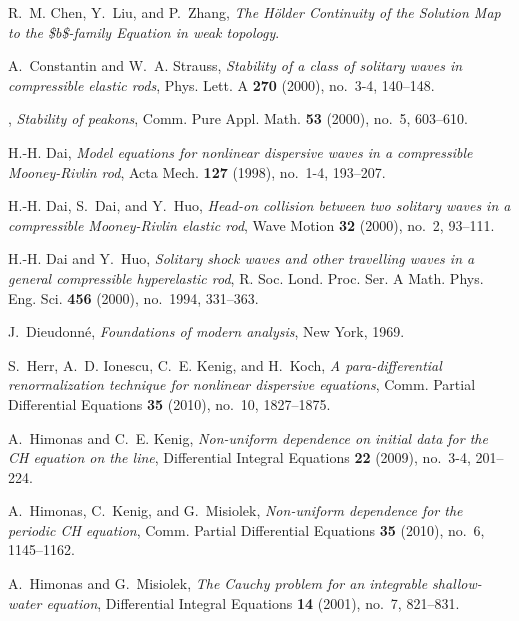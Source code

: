 \documentclass[12pt,reqno]{amsbook}
\numberwithin{section}{chapter}
\numberwithin{equation}{section}  %
\theoremstyle{remark}
\begin{document}
\begin{thebibliography}{HIKK10}
R.~M. Chen, Y.~Liu, and P.~Zhang, \emph{{The H{\"o}lder Continuity of the
  Solution Map to the {\$}b{\$}-family Equation in weak topology}}.

A.~Constantin and W.~A. Strauss, \emph{{Stability of a class of solitary waves
  in compressible elastic rods}}, Phys. Lett. A \textbf{270} (2000), no.~3-4,
  140--148.

\bysame, \emph{{Stability of peakons}}, Comm. Pure Appl. Math. \textbf{53}
  (2000), no.~5, 603--610.

H.-H. Dai, \emph{{Model equations for nonlinear dispersive waves in a
  compressible Mooney-Rivlin rod}}, Acta Mech. \textbf{127} (1998), no.~1-4,
  193--207.

H.-H. Dai, S.~Dai, and Y.~Huo, \emph{{Head-on collision between two solitary
  waves in a compressible Mooney-Rivlin elastic rod}}, Wave Motion \textbf{32}
  (2000), no.~2, 93--111.

H.-H. Dai and Y.~Huo, \emph{{Solitary shock waves and other travelling waves in
  a general compressible hyperelastic rod}}, R. Soc. Lond. Proc. Ser. A Math.
  Phys. Eng. Sci. \textbf{456} (2000), no.~1994, 331--363.

J.~Dieudonn{\'e}, \emph{{Foundations of modern analysis}}, New York, 1969.

S.~Herr, A.~D. Ionescu, C.~E. Kenig, and H.~Koch, \emph{{A para-differential
  renormalization technique for nonlinear dispersive equations}}, Comm. Partial
  Differential Equations \textbf{35} (2010), no.~10, 1827--1875.

A.~Himonas and C.~E. Kenig, \emph{{Non-uniform dependence on initial data for
  the CH equation on the line}}, Differential Integral Equations \textbf{22}
  (2009), no.~3-4, 201--224.

A.~Himonas, C.~Kenig, and G.~Misiolek, \emph{{Non-uniform dependence for the
  periodic CH equation}}, Comm. Partial Differential Equations \textbf{35}
  (2010), no.~6, 1145--1162.

A.~Himonas and G.~Misiolek, \emph{{The Cauchy problem for an integrable
  shallow-water equation}}, Differential Integral Equations \textbf{14} (2001),
  no.~7, 821--831.


\end{thebibliography}
\end{document}

